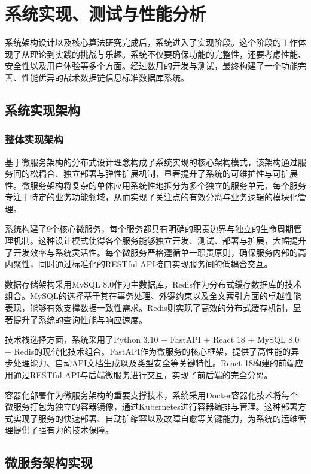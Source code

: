\chapter{系统实现、测试与性能分析}

系统架构设计以及核心算法研究完成后，系统进入了实现阶段。这个阶段的工作体现了从理论到实践的挑战与乐趣。系统不仅要确保功能的完整性，还要考虑性能、安全性以及用户体验等多个方面。经过数月的开发与测试，最终构建了一个功能完善、性能优异的战术数据链信息标准数据库系统。

\section{系统实现架构}

\subsection{整体实现架构}

基于微服务架构的分布式设计理念构成了系统实现的核心架构模式，该架构通过服务间的松耦合、独立部署与弹性扩展机制，显著提升了系统的可维护性与可扩展性。微服务架构将复杂的单体应用系统性地拆分为多个独立的服务单元，每个服务专注于特定的业务功能领域，从而实现了关注点的有效分离与业务逻辑的模块化管理。

系统构建了9个核心微服务，每个服务都具有明确的职责边界与独立的生命周期管理机制。这种设计模式使得各个服务能够独立开发、测试、部署与扩展，大幅提升了开发效率与系统灵活性。每个微服务严格遵循单一职责原则，确保服务内部的高内聚性，同时通过标准化的RESTful API接口实现服务间的低耦合交互。

数据存储架构采用MySQL 8.0作为主数据库，Redis作为分布式缓存数据库的技术组合。MySQL的选择基于其在事务处理、外键约束以及全文索引方面的卓越性能表现，能够有效支撑数据一致性需求。Redis则实现了高效的分布式缓存机制，显著提升了系统的查询性能与响应速度。

技术栈选择方面，系统采用了Python 3.10 + FastAPI + React 18 + MySQL 8.0 + Redis的现代化技术组合。FastAPI作为微服务的核心框架，提供了高性能的异步处理能力、自动API文档生成以及类型安全等关键特性。React 18构建的前端应用通过RESTful API与后端微服务进行交互，实现了前后端的完全分离。

容器化部署作为微服务架构的重要支撑技术，系统采用Docker容器化技术将每个微服务打包为独立的容器镜像，通过Kubernetes进行容器编排与管理。这种部署方式实现了服务的快速部署、自动扩缩容以及故障自愈等关键能力，为系统的运维管理提供了强有力的技术保障。

\section{微服务架构实现}

